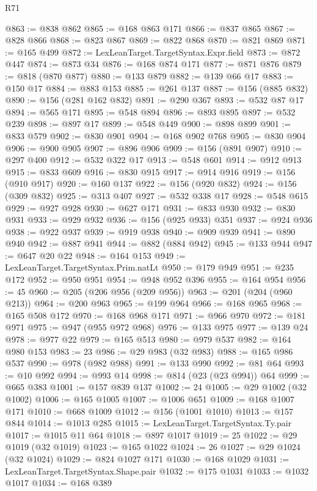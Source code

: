 \begin{lexlean}{R71}
\begin{coremodule}
@863 := @838 @862
@865 := @168 @863 @171
@866 := @837 @865
@867 := @828 @866
@868 := @823 @867
@869 := @822 @868
@870 := @821 @869
@871 := @165 @499
@872 := LexLeanTarget.TargetSyntax.Expr.field
@873 := @872 @447
@874 := @873 @34
@876 := @168 @874 @171
@877 := @871 @876
@879 := @818 (@870 @877)
@880 := @133 @879
@882 := @139 @66 @17
@883 := @150 @17
@884 := @883 @153
@885 := @261 @137
@887 := @156 (@885 @832)
@890 := @156 (@281 @162 @832)
@891 := @290 @367
@893 := @532 @87 @17
@894 := @565 @171
@895 := @548 @894
@896 := @893 @895
@897 := @532 @239
@898 := @897 @17
@899 := @548 @449
@900 := @898 @899
@901 := @833 @579
@902 := @830 @901
@904 := @168 @902 @768
@905 := @830 @904
@906 := @900 @905
@907 := @896 @906
@909 := @156 (@891 @907)
@910 := @297 @400
@912 := @532 @322 @17
@913 := @548 @601
@914 := @912 @913
@915 := @833 @609
@916 := @830 @915
@917 := @914 @916
@919 := @156 (@910 @917)
@920 := @160 @137
@922 := @156 (@920 @832)
@924 := @156 (@309 @832)
@925 := @313 @407
@927 := @532 @338 @17
@928 := @548 @615
@929 := @927 @928
@930 := @627 @171
@931 := @833 @930
@932 := @830 @931
@933 := @929 @932
@936 := @156 (@925 @933) @351
@937 := @924 @936
@938 := @922 @937
@939 := @919 @938
@940 := @909 @939
@941 := @890 @940
@942 := @887 @941
@944 := @882 (@884 @942)
@945 := @133 @944
@947 := @647 @20 @22
@948 := @164 @153
@949 := LexLeanTarget.TargetSyntax.Prim.natLt
@950 := @179 @949
@951 := @235 @172
@952 := @950 @951
@954 := @948 @952 @396
@955 := @164 @954
@956 := 45
@960 := @205 (@206 @956 (@209 @956))
@963 := @201 (@204 (@960 @213))
@964 := @200 @963
@965 := @199 @964
@966 := @168 @965
@968 := @165 @508 @172
@970 := @168 @968 @171
@971 := @966 @970
@972 := @181 @971
@975 := @947 (@955 @972 @968)
@976 := @133 @975
@977 := @139 @24
@978 := @977 @22
@979 := @165 @513
@980 := @979 @537
@982 := @164 @980 @153
@983 := 23
@986 := @29 @983 (@32 @983)
@988 := @165 @986 @537
@990 := @978 (@982 @988)
@991 := @133 @990
@992 := @81 @64
@993 := @10 @992
@994 := @993 @14
@998 := @814 (@23 (@23 @994)) @64
@999 := @665 @383
@1001 := @157 @839 @137
@1002 := 24
@1005 := @29 @1002 (@32 @1002)
@1006 := @165 @1005
@1007 := @1006 @651
@1009 := @168 @1007 @171
@1010 := @668 @1009
@1012 := @156 (@1001 @1010)
@1013 := @157 @844
@1014 := @1013 @285
@1015 := LexLeanTarget.TargetSyntax.Ty.pair
@1017 := @1015 @11 @64
@1018 := @897 @1017
@1019 := 25
@1022 := @29 @1019 (@32 @1019)
@1023 := @165 @1022
@1024 := 26
@1027 := @29 @1024 (@32 @1024)
@1029 := @824 @1027 @171
@1030 := @168 @1029
@1031 := LexLeanTarget.TargetSyntax.Shape.pair
@1032 := @175 @1031
@1033 := @1032 @1017
@1034 := @168 @389

\end{coremodule}
\end{lexlean}
